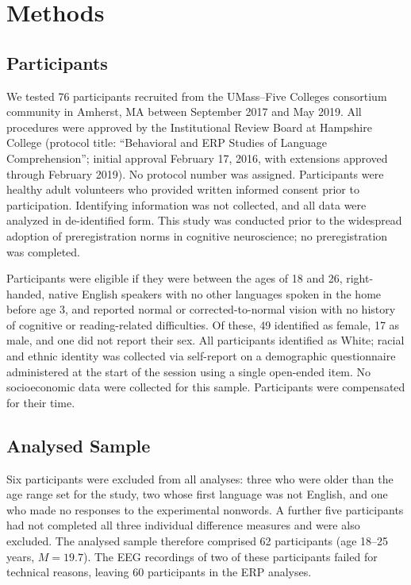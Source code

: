 \documentclass[utf8]{FrontiersinHarvard} %
\begin{document}
	
	\section{Methods}
	
	\subsection*{Participants}
	
	We tested 76 participants recruited from the UMass--Five Colleges consortium community in Amherst, MA between September 2017 and May 2019. All procedures were approved by the Institutional Review Board at Hampshire College (protocol title: ``Behavioral and ERP Studies of Language Comprehension''; initial approval February 17, 2016, with extensions approved through February 2019). No protocol number was assigned. Participants were healthy adult volunteers who provided written informed consent prior to participation. Identifying information was not collected, and all data were analyzed in de-identified form. This study was conducted prior to the widespread adoption of preregistration norms in cognitive neuroscience; no preregistration was completed.
	
	Participants were eligible if they were between the ages of 18 and 26, right-handed, native English speakers with no other languages spoken in the home before age 3, and reported normal or corrected-to-normal vision with no history of cognitive or reading-related difficulties. Of these, 49 identified as female, 17 as male, and one did not report their sex. All participants identified as White; racial and ethnic identity was collected via self-report on a demographic questionnaire administered at the start of the session using a single open-ended item. No socioeconomic data were collected for this sample. Participants were compensated for their time.
	
	\subsection{Analysed Sample}
	
	Six participants were excluded from all analyses: three who were older than the age range set for the study, two whose first language was not English, and one who made no responses to the experimental nonwords. A further five participants had not completed all three individual difference measures and were also excluded. The analysed sample therefore comprised 62 participants (age 18--25 years, $M = 19.7$). The EEG recordings of two of these participants failed for technical reasons, leaving 60 participants in the ERP analyses. 
	
\end{document}
